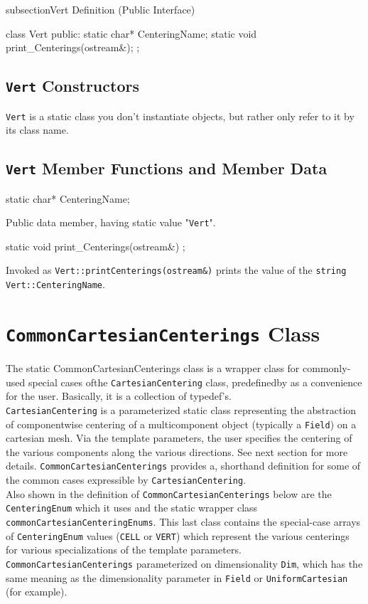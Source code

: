 subsection{Vert Definition (Public Interface)}
\begin{smallcode}
class Vert { 
public: 
    static char* CenteringName;
    static void print_Centerings(ostream&);
} ; 
\end{smallcode}


\subsection{\texttt{Vert} Constructors}
\texttt{Vert} is a static class you don't instantiate objects, but rather only refer to it by its class name. 

\subsection{\texttt{Vert} Member Functions and Member Data}

\begin{smallcode}
static char* CenteringName; 
\end{smallcode}
Public data member, having static value "\texttt{Vert}".
 
\begin{smallcode}
static void print_Centerings(ostream&) ;
\end{smallcode}
Invoked as \texttt{Vert::printCenterings(ostream\&)}  prints the value of the \texttt{string Vert::CenteringName}. 


\section{\texttt{CommonCartesianCenterings} Class}
The static CommonCartesianCenterings class is a wrapper class for commonly-used special cases ofthe \texttt{CartesianCentering} class, predefinedby \ippl as a convenience for the user. 
Basically, it is a collection of typedef's. \\
\texttt{CartesianCentering} is a parameterized static class representing the abstraction of componentwise centering of a multicomponent object (typically a \texttt{Field}) 
on a cartesian mesh. Via the template parameters, the user specifies the centering of the various components along the various directions. See next section for more details. 
\texttt{CommonCartesianCenterings} provides a, shorthand definition for some of the common cases expressible by \texttt{CartesianCentering}. \\
Also shown in the definition of \texttt{CommonCartesianCenterings} below are the \texttt{CenteringEnum} which it uses and the static wrapper class \\ \texttt{commonCartesianCenteringEnums}. 
This last class contains the special-case arrays of \texttt{CenteringEnum} values (\texttt{CELL} or \texttt{VERT}) which represent the various centerings for various specializations of the template parameters. \\
\texttt{CommonCartesianCenterings}  parameterized on dimensionality \texttt{Dim}, which has the same meaning as the dimensionality parameter in \texttt{Field} or \texttt{UniformCartesian} (for example). 

